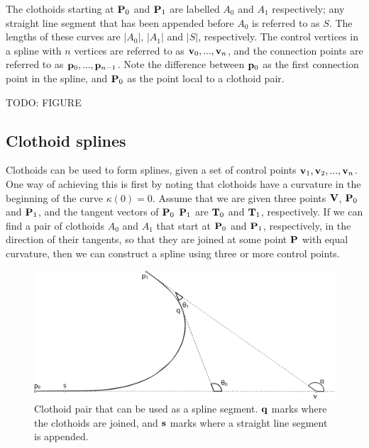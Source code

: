 The clothoids starting at ${\mathbf P}_0$ and ${\mathbf P}_1$ are labelled $A_0$ and $A_1$ respectively; any straight line segment that has been appended before $A_0$ is referred to as $S$. The lengths of these curves are $|A_0|$, $|A_1|$ and $|S|$, respectively. The control vertices in a spline with $n$ vertices are referred to as ${\mathbf v}_0, ..., {\mathbf v}_n$, and the connection points are referred to as ${\mathbf p}_0, ..., {\mathbf p}_{n-1}$. Note the difference between ${\mathbf p}_0$ as the first connection point in the spline, and ${\mathbf P}_0$ as the point local to a clothoid pair.

TODO: FIGURE

\subsection{Clothoid splines}
\label{sec:clothoid_spline}
Clothoids can be used to form splines, given a set of control points $\mathbf{v}_1, \mathbf{v}_2, ..., \mathbf{v}_n$.\cite{clothoid} One way of achieving this is first by noting that clothoids have a curvature in the beginning of the curve $\kappa(0) = 0$. Assume that we are given three points $\mathbf{V}$, $\mathbf{P}_0$ and $\mathbf{P}_1$, and the tangent vectors of ${\mathbf P}_0$ ${\mathbf P}_1$ are ${\mathbf T}_0$ and ${\mathbf T}_1$, respectively. If we can find a pair of clothoids $A_0$ and $A_1$ that start at $\mathbf{P}_0$ and $\mathbf{P}_1$, respectively, in the direction of their tangents, so that they are joined at some point $\mathbf{P}$ with equal curvature, then we can construct a spline using three or more control points.\cite{clothoid} 

\begin{figure}[ht]
\centering
\includegraphics[width=\textwidth]{figure/clothoid_pair}
\caption{Clothoid pair that can be used as a spline segment. $\mathbf{q}$ marks where the clothoids are joined, and $\mathbf{s}$ marks where a straight line segment is appended.}
\label{fig:clothoid_pair}
\end{figure}


